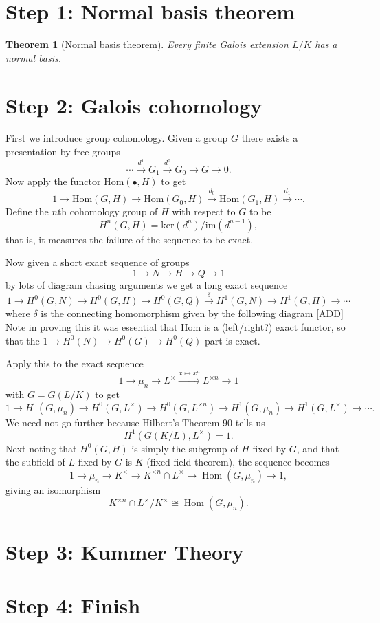 \documentclass[12pt]{article}
\theoremstyle{norm}
\newtheorem{thm}{Theorem}[section]
\newcommand{\Hom}{\operatorname{Hom}}
\begin{document}
\section{Step 1: Normal basis theorem}
\begin{thm}[Normal basis theorem] Every finite Galois extension $L/K$ has a normal basis.
\end{thm}


\section{Step 2: Galois cohomology}
First we introduce group cohomology. Given a group $G$ there exists a presentation by free groups
\[
\cdots \xrightarrow{d^1}G_1\xrightarrow{d^0} G_0\to G\to 0.
\]
Now apply the functor $\text{Hom}(\bullet, H)$ to get 
\[
1\to \text{Hom}(G,H)\to \text{Hom}(G_0,H)\xrightarrow{d_0}\text{Hom}(G_1,H)\xrightarrow{d_1}\cdots.
\]
Define the $n$th cohomology group of $H$ with respect to $G$ to be
\[
H^n(G,H)=\text{ker}(d^n)/\text{im}(d^{n-1}),
\]
that is, it measures the failure of the sequence to be exact.

Now given a short exact sequence of groups
\[
1\to N\to H\to Q\to 1
\]
by lots of diagram chasing arguments we get a long exact sequence
\[
1\to H^0(G,N)\to H^0(G,H)\to H^0(G,Q)\xrightarrow{\delta} H^1(G,N) \to H^1(G,H)\to \cdots 
\]
where $\delta$ is the connecting homomorphism given by the following diagram
[ADD]
Note in proving this it was essential that $\text{Hom}$ is a (left/right?) exact functor, so that the $1\to H^0(N)\to H^0(G)\to H^0(Q)$ part is exact.

Apply this to the exact sequence
\[
1\to \mu_n \to L^{\times}\xrightarrow{x\mapsto x^n} L^{\times n}\to 1 
\]
with $G=G(L/K)$ to get
\[
1\to H^0(G,\mu_n) \to H^0(G,L^{\times})\to H^0(G,L^{\times n})\to H^1(G, \mu_n)\to H^1(G,L^{\times})\to \cdots.
\]
We need not go further because Hilbert's Theorem 90 tells us
\[
H^1(G(K/L), L^{\times})=1.
\]
Next noting that $H^0(G, H)$ is simply the subgroup of $H$ fixed by $G$, and that the subfield of $L$ fixed by $G$ is $K$ (fixed field theorem), the sequence becomes
\[
1\to \mu_n\to K^{\times}\to K^{\times n}\cap L^{\times} \to \Hom(G, \mu_n)\to 1,
\]
giving an isomorphism
\[
K^{\times n}\cap L^{\times}/K^{\times}\cong \Hom(G, \mu_n).
\]
\section{Step 3: Kummer Theory}

\section{Step 4: Finish}
\end{document}
